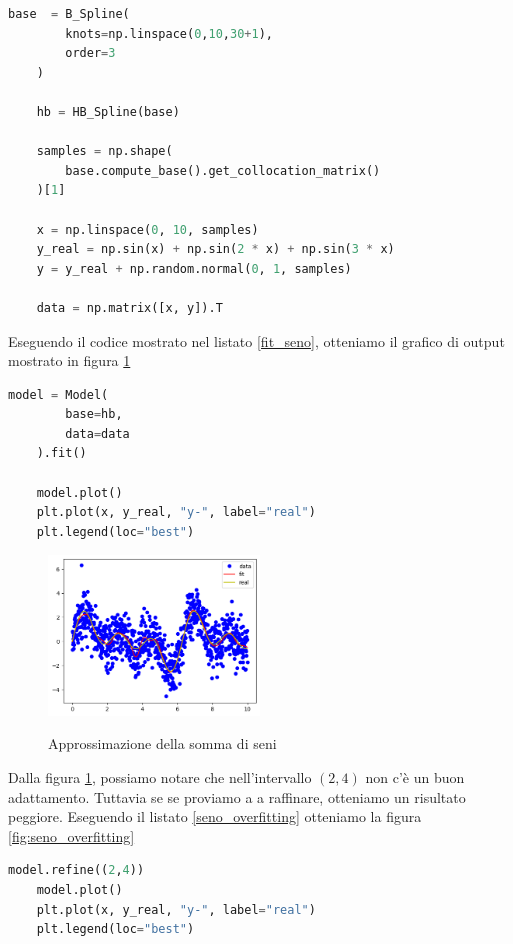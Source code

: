 \documentclass[../main.tex]{subfiles}
\begin{document}
\begin{lstlisting}[language=Python, caption={Generazione somma di seni},label=gen_seni]
    base  = B_Spline(
        knots=np.linspace(0,10,30+1),
        order=3
    )
    
    hb = HB_Spline(base)
        
    samples = np.shape(
        base.compute_base().get_collocation_matrix()
    )[1]
    
    x = np.linspace(0, 10, samples)
    y_real = np.sin(x) + np.sin(2 * x) + np.sin(3 * x)
    y = y_real + np.random.normal(0, 1, samples)
    
    data = np.matrix([x, y]).T
\end{lstlisting}
Eseguendo il codice mostrato nel listato \ref{fit_seno}, otteniamo il grafico di output mostrato in figura \ref{fig:seno_fit}
\begin{lstlisting}[language=Python, caption={Fit somma di seni},label=fit_seno]
    model = Model(
        base=hb,
        data=data
    ).fit()
    
    model.plot()
    plt.plot(x, y_real, "y-", label="real")
    plt.legend(loc="best")
\end{lstlisting}
\begin{figure}[ht]
    \caption{Approssimazione della somma di seni}
    \includegraphics[width=0.5\textwidth]{Immagini/esempi/somma_seni.png}
    \centering
    \label{fig:seno_fit}
\end{figure}
Dalla figura \ref{fig:seno_fit}, possiamo notare che nell'intervallo $(2,4)$ non c'è un buon adattamento. Tuttavia se se proviamo a 
a raffinare, otteniamo un risultato peggiore. Eseguendo il listato \ref{seno_overfitting} otteniamo la figura \ref{fig:seno_overfitting}
\begin{lstlisting}[language=Python, caption={Overfitting nella somma di seni},label=seno_overfitting]
    model.refine((2,4))
    model.plot()
    plt.plot(x, y_real, "y-", label="real")
    plt.legend(loc="best")   
\end{lstlisting}
\end{document}
